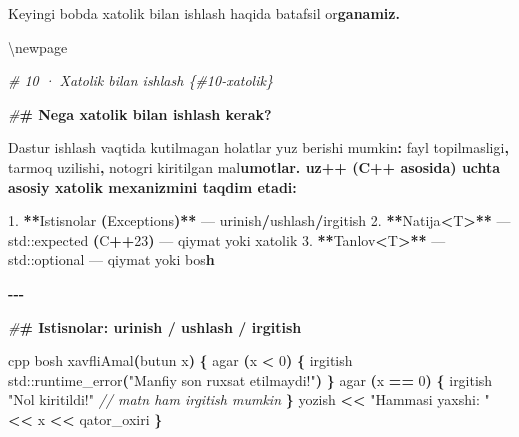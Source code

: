 \documentclass[a4paper,11pt,twoside,openright]{book}
\newenvironment{Shaded}{\begin{snugshade}}{\end{snugshade}}
\newcommand{\BuiltInTok}[1]{#1}
\newcommand{\CharTok}[1]{\textcolor[rgb]{0.31,0.60,0.02}{#1}}
\newcommand{\CommentTok}[1]{\textcolor[rgb]{0.56,0.35,0.01}{\textit{#1}}}
\newcommand{\DecValTok}[1]{\textcolor[rgb]{0.00,0.00,0.81}{#1}}
\newcommand{\ErrorTok}[1]{\textcolor[rgb]{0.64,0.00,0.00}{\textbf{#1}}}
\newcommand{\FloatTok}[1]{\textcolor[rgb]{0.00,0.00,0.81}{#1}}
\newcommand{\NormalTok}[1]{#1}
\newcommand{\OperatorTok}[1]{\textcolor[rgb]{0.81,0.36,0.00}{\textbf{#1}}}
\newcommand{\PreprocessorTok}[1]{\textcolor[rgb]{0.56,0.35,0.01}{\textit{#1}}}
\newcommand{\StringTok}[1]{\textcolor[rgb]{0.31,0.60,0.02}{#1}}
\begin{document}
\begin{Shaded}
\begin{Highlighting}[]
\NormalTok{Keyingi bobda xatolik bilan ishlash haqida batafsil o}\CharTok{\textquotesingle{}r}\ErrorTok{ganamiz.}


\NormalTok{\textbackslash{}newpage}

\PreprocessorTok{\# 10 · Xatolik bilan ishlash \{\#10{-}xatolik\}}

\PreprocessorTok{\#}\ErrorTok{\# Nega xatolik bilan ishlash kerak?}

\NormalTok{Dastur ishlash vaqtida kutilmagan holatlar yuz berishi mumkin}\OperatorTok{:}\NormalTok{ fayl topilmasligi}\OperatorTok{,}\NormalTok{ tarmoq uzilishi}\OperatorTok{,}\NormalTok{ noto}\CharTok{\textquotesingle{}g\textquotesingle{}}\NormalTok{ri kiritilgan ma}\CharTok{\textquotesingle{}l}\ErrorTok{umotlar. uz++ (C++ asosida) uchta asosiy xatolik mexanizmini taqdim etadi:}

\FloatTok{1.} \OperatorTok{**}\NormalTok{Istisnolar }\OperatorTok{(}\NormalTok{Exceptions}\OperatorTok{)**}\NormalTok{ — }\ErrorTok{\textasciigrave{}}\NormalTok{urinish}\ErrorTok{\textasciigrave{}}\OperatorTok{/}\ErrorTok{\textasciigrave{}}\NormalTok{ushlash}\ErrorTok{\textasciigrave{}}\OperatorTok{/}\ErrorTok{\textasciigrave{}}\NormalTok{irgitish}\ErrorTok{\textasciigrave{}}
\FloatTok{2.} \OperatorTok{**}\ErrorTok{\textasciigrave{}}\NormalTok{Natija}\OperatorTok{\textless{}}\NormalTok{T}\OperatorTok{\textgreater{}}\ErrorTok{\textasciigrave{}}\OperatorTok{**}\NormalTok{ — }\ErrorTok{\textasciigrave{}}\BuiltInTok{std::}\NormalTok{expected}\ErrorTok{\textasciigrave{}} \OperatorTok{(}\NormalTok{C}\OperatorTok{++}\DecValTok{23}\OperatorTok{)}\NormalTok{ — qiymat yoki xatolik}
\FloatTok{3.} \OperatorTok{**}\ErrorTok{\textasciigrave{}}\NormalTok{Tanlov}\OperatorTok{\textless{}}\NormalTok{T}\OperatorTok{\textgreater{}}\ErrorTok{\textasciigrave{}}\OperatorTok{**}\NormalTok{ — }\ErrorTok{\textasciigrave{}}\BuiltInTok{std::}\NormalTok{optional}\ErrorTok{\textasciigrave{}}\NormalTok{ — qiymat yoki bo}\CharTok{\textquotesingle{}s}\ErrorTok{h}

\OperatorTok{{-}{-}{-}}

\PreprocessorTok{\#}\ErrorTok{\# Istisnolar: \textasciigrave{}urinish\textasciigrave{} / \textasciigrave{}ushlash\textasciigrave{} / \textasciigrave{}irgitish\textasciigrave{}}

\ErrorTok{\textasciigrave{}\textasciigrave{}\textasciigrave{}}\NormalTok{cpp}
\NormalTok{bosh xavfliAmal}\OperatorTok{(}\NormalTok{butun x}\OperatorTok{)} \OperatorTok{\{}
\NormalTok{    agar }\OperatorTok{(}\NormalTok{x }\OperatorTok{\textless{}} \DecValTok{0}\OperatorTok{)} \OperatorTok{\{}
\NormalTok{        irgitish }\BuiltInTok{std::}\NormalTok{runtime\_error}\OperatorTok{(}\StringTok{"Manfiy son ruxsat etilmaydi!"}\OperatorTok{)}
    \OperatorTok{\}}
\NormalTok{    agar }\OperatorTok{(}\NormalTok{x }\OperatorTok{==} \DecValTok{0}\OperatorTok{)} \OperatorTok{\{}
\NormalTok{        irgitish }\StringTok{"Nol kiritildi!"}   \CommentTok{// matn ham irgitish mumkin}
    \OperatorTok{\}}
\NormalTok{    yozish }\OperatorTok{\textless{}\textless{}} \StringTok{"Hammasi yaxshi: "} \OperatorTok{\textless{}\textless{}}\NormalTok{ x }\OperatorTok{\textless{}\textless{}}\NormalTok{ qator\_oxiri}
\OperatorTok{\}}


\end{Highlighting}
\end{Shaded}
\end{document}
